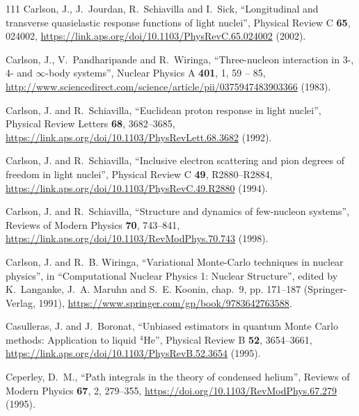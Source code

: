 \documentclass[12pt,letterpaper,UTF8]{report}
\begin{document}
{\begin{thebibliography}{111}
Carlson, J., J.~Jourdan, R.~Schiavilla and I.~Sick, \enquote{Longitudinal and
  transverse quasielastic response functions of light nuclei}, Physical Review
  C \textbf{65}, 024002,
  \urlprefix\url{https://link.aps.org/doi/10.1103/PhysRevC.65.024002} (2002).

Carlson, J., V.~Pandharipande and R.~Wiringa, \enquote{Three-nucleon
  interaction in 3-, 4- and $\infty$-body systems}, Nuclear Physics A
  \textbf{401}, 1, 59 -- 85,
  \urlprefix\url{http://www.sciencedirect.com/science/article/pii/0375947483903366}
  (1983).

Carlson, J. and R.~Schiavilla, \enquote{{Euclidean} proton response in light
  nuclei}, Physical Review Letters \textbf{68}, 3682--3685,
  \urlprefix\url{https://link.aps.org/doi/10.1103/PhysRevLett.68.3682} (1992).

Carlson, J. and R.~Schiavilla, \enquote{Inclusive electron scattering and pion
  degrees of freedom in light nuclei}, Physical Review C \textbf{49},
  R2880--R2884,
  \urlprefix\url{https://link.aps.org/doi/10.1103/PhysRevC.49.R2880} (1994).

Carlson, J. and R.~Schiavilla, \enquote{Structure and dynamics of few-nucleon
  systems}, Reviews of Modern Physics \textbf{70}, 743--841,
  \urlprefix\url{https://link.aps.org/doi/10.1103/RevModPhys.70.743} (1998).

Carlson, J. and R.~B. Wiringa, \enquote{Variational {Monte}-{Carlo} techniques
  in nuclear physics}, in \enquote{Computational Nuclear Physics 1: Nuclear
  Structure}, edited by K.~Langanke, J.~A. Maruhn and S.~E. Koonin, chap.~9,
  pp. 171--187 (Springer-Verlag, 1991),
  \urlprefix\url{https://www.springer.com/gp/book/9783642763588}.

Casulleras, J. and J.~Boronat, \enquote{Unbiased estimators in quantum {Monte}
  {Carlo} methods: Application to liquid $^{4}\mathrm{He}$}, Physical Review B
  \textbf{52}, 3654--3661,
  \urlprefix\url{https://link.aps.org/doi/10.1103/PhysRevB.52.3654} (1995).

Ceperley, D.~M., \enquote{Path integrals in the theory of condensed helium},
  Reviews of Modern Physics \textbf{67}, 2, 279--355,
  \urlprefix\url{https://doi.org/10.1103/RevModPhys.67.279} (1995).


\end{thebibliography}}
\end{document}
